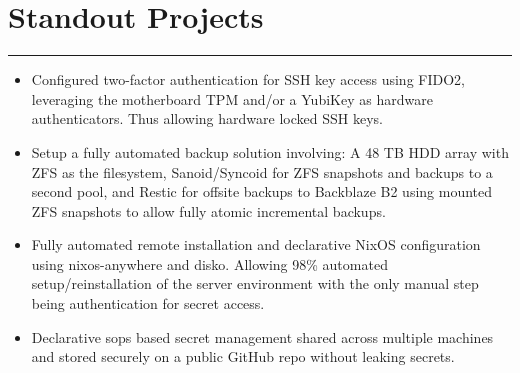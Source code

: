 \documentclass[a4paper,11pt]{article}
\begin{document}
\vspace{-1.1cm}
\section*{\hspace*{1em} Standout Projects}
\vspace{-0.2cm}
\hrule
\vspace{0.3cm}
\begin{itemize}
    \item Configured two-factor authentication for SSH key access using FIDO2, leveraging the motherboard TPM and/or a YubiKey as hardware authenticators. Thus allowing hardware locked SSH keys. \\
    \vspace{-0.5cm}
    \item Setup a fully automated backup solution involving: A 48 TB HDD array with ZFS as the filesystem, Sanoid/Syncoid for ZFS snapshots and backups to a second pool, and Restic for offsite backups to Backblaze B2 using mounted ZFS snapshots to allow fully atomic incremental backups. \\
    \vspace{-0.5cm}
    \item Fully automated remote installation and declarative NixOS configuration using nixos-anywhere and disko. Allowing 98\% automated setup/reinstallation of the server environment with the only manual step being authentication for secret access. \\
    \vspace{-0.5cm}
    \item Declarative sops based secret management shared across multiple machines and stored securely on a public GitHub repo without leaking secrets. \\
    \vspace{-0.5cm}
\end{itemize}
\end{document}
